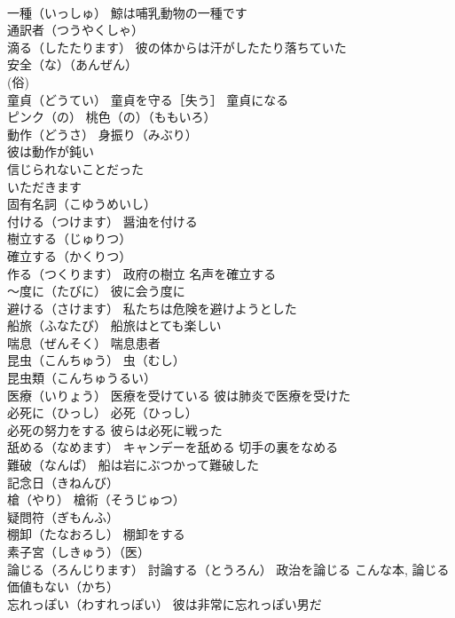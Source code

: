 \documentclass[8pt]{extreport}
\begin{document}
\begin{CJK}{UTF8}{min}
\\	一種（いっしゅ） 鯨は哺乳動物の一種です
\\	通訳者（つうやくしゃ）
\\	滴る（したたります） 彼の体からは汗がしたたり落ちていた
\\	安全（な）（あんぜん）
\\	(俗) 
\\	童貞（どうてい） 童貞を守る［失う］ 童貞になる
\\	ピンク（の） 桃色（の）（ももいろ）
\\	動作（どうさ） 身振り（みぶり）
\\	彼は動作が鈍い
\\	信じられないことだった
\\	いただきます
\\	固有名詞（こゆうめいし）
\\	付ける（つけます） 醤油を付ける
\\	樹立する（じゅりつ）
\\	確立する（かくりつ）
\\	作る（つくります） 政府の樹立 名声を確立する
\\	～度に（たびに） 彼に会う度に
\\	避ける（さけます） 私たちは危険を避けようとした
\\	船旅（ふなたび） 船旅はとても楽しい
\\	喘息（ぜんそく） 喘息患者
\\	昆虫（こんちゅう） 虫（むし）
\\	昆虫類（こんちゅうるい）
\\	医療（いりょう） 医療を受けている 彼は肺炎で医療を受けた
\\	必死に（ひっし） 必死（ひっし）
\\	必死の努力をする 彼らは必死に戦った
\\	舐める（なめます） キャンデーを舐める 切手の裏をなめる
\\	難破（なんぱ） 船は岩にぶつかって難破した
\\	記念日（きねんび）
\\	槍（やり） 槍術（そうじゅつ）
\\	疑問符（ぎもんふ）
\\	棚卸（たなおろし） 棚卸をする
\\	素子宮（しきゅう）（医）
\\	論じる（ろんじります） 討論する（とうろん） 政治を論じる こんな本, 論じる価値もない（かち）
\\	忘れっぽい（わすれっぽい） 彼は非常に忘れっぽい男だ

\end{CJK}
\end{document}
